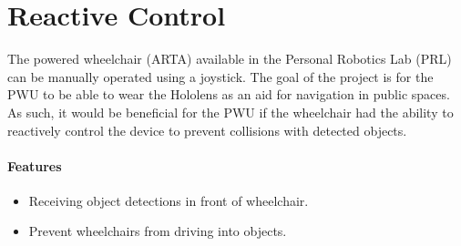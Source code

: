 \section{Reactive Control} \label{sec:reactive}
The powered wheelchair (ARTA) available in the Personal Robotics Lab (PRL) can be manually operated using a joystick. The goal of the project is for the PWU to be able to wear the Hololens as an aid for navigation in public spaces. As such, it would be beneficial for the PWU if the wheelchair had the ability to reactively control the device to prevent collisions with detected objects.

\paragraph{Features}
\begin{itemize}
	\item Receiving object detections in front of wheelchair.
	\item Prevent wheelchairs from driving into objects.
\end{itemize}
